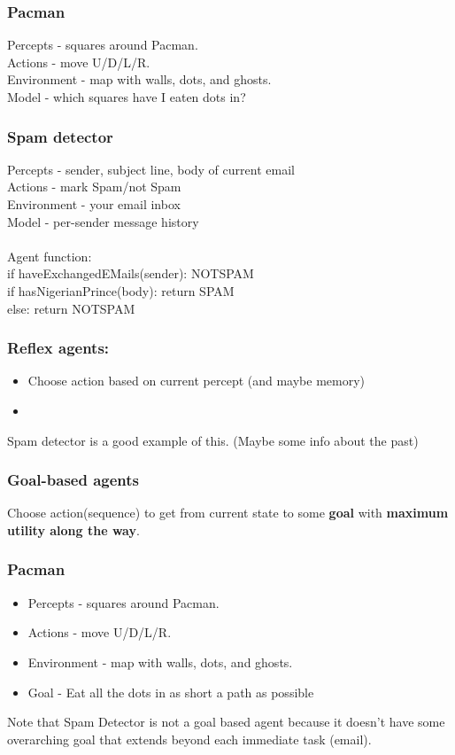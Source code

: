 \documentclass[10pt]{article}
\theoremstyle{plain}
\begin{document}
\subsubsection*{Pacman}

Percepts - squares around Pacman. \\
Actions - move U/D/L/R.\\
Environment - map with walls, dots, and ghosts. \\
Model - which squares have I eaten dots in?
\subsubsection*{Spam detector}

Percepts - sender, subject line, body of current email\\
Actions - mark Spam/not Spam\\
Environment - your email inbox\\
Model - per-sender message history\\\\
Agent function: \\
if haveExchangedEMails(sender): NOTSPAM\\
if hasNigerianPrince(body): return SPAM\\
else: return NOTSPAM

\subsubsection*{Reflex agents: }
\begin{itemize}
\item Choose action based on current percept (and maybe memory)
\item 
\end{itemize}
Spam detector is a good example of this. (Maybe some info about the past)

\subsubsection*{Goal-based agents}
Choose action(sequence) to get from current state to some \textbf{goal} with \textbf{maximum utility along the way}. 

\subsubsection*{Pacman}
\begin{itemize}
\item Percepts - squares around Pacman. \\
\item Actions - move U/D/L/R.\\
\item Environment - map with walls, dots, and ghosts. \\
\item Goal - Eat all the dots in as short a path as possible
\end{itemize}
Note that Spam Detector is not a goal based agent because it doesn't have some overarching goal that extends beyond each immediate task (email). 
\end{document}
